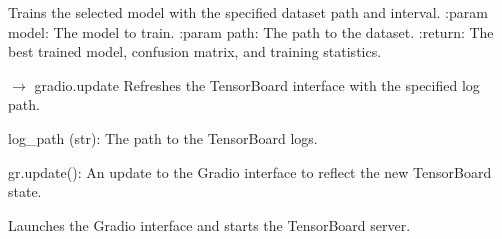 \documentclass[letterpaper,10pt,english]{sphinxmanual}
\begin{document}

\begin{fulllineitems}
\label{\detokenize{autoapi/src/Interface/index:src.Interface.__train}}
\pysigstartsignatures
\pysiglinewithargsret
{}
{\sphinxparamcomma {}}
{}
\pysigstopsignatures
\sphinxAtStartPar
Trains the selected model with the specified dataset path and interval.
:param model: The model to train.
:param path: The path to the dataset.
:return: The best trained model, confusion matrix, and training statistics.

\end{fulllineitems}


\begin{fulllineitems}
\label{\detokenize{autoapi/src/Interface/index:src.Interface.__refresh_tensorboard}}
\pysigstartsignatures
\pysiglinewithargsret
{}
{}
{{ $\rightarrow$ gradio.update}}
\pysigstopsignatures
\sphinxAtStartPar
Refreshes the TensorBoard interface with the specified log path.
\begin{description}
\sphinxAtStartPar
log\_path (str): The path to the TensorBoard logs.

\sphinxAtStartPar
gr.update(): An update to the Gradio interface to reflect the new TensorBoard state.

\end{description}

\end{fulllineitems}


\begin{fulllineitems}
\label{\detokenize{autoapi/src/Interface/index:src.Interface.launch}}
\pysigstartsignatures
\pysiglinewithargsret
{}
{}
{}
\pysigstopsignatures
\sphinxAtStartPar
Launches the Gradio interface and starts the TensorBoard server.

\end{fulllineitems}
\end{document}
